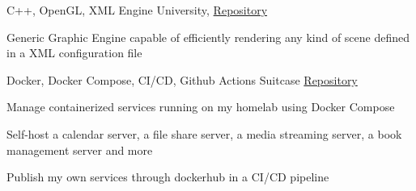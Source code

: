 \begin{cventries}

\cventry
{C++, OpenGL, XML} %
{Engine}%
{University, \href{https://github.com/JoseFilipeFerreira/engine}{Repository}} %
{} %
{ %
\begin{cvitems}
\item {Generic Graphic Engine capable of efficiently rendering any kind of scene
  defined in a XML configuration file}
\end{cvitems}
}


\cventry
{Docker, Docker Compose, CI/CD, Github Actions} %
{Suitcase} %
{\href{https://github.com/JoseFilipeFerreira/suitcase}{Repository}} %
{} %
{ %
\begin{cvitems}
\item{Manage containerized services running on my homelab using Docker Compose}
\item{Self-host a calendar server, a file share server, a media streaming server, a book
  management server and more}
\item{Publish my own services through dockerhub in a CI/CD pipeline}
\end{cvitems}
}


\end{cventries}

